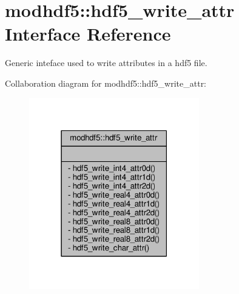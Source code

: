\hypertarget{interfacemodhdf5_1_1hdf5__write__attr}{}\section{modhdf5\+:\+:hdf5\+\_\+write\+\_\+attr Interface Reference}
\label{interfacemodhdf5_1_1hdf5__write__attr}


Generic inteface used to write attributes in a hdf5 file.  




Collaboration diagram for modhdf5\+:\+:hdf5\+\_\+write\+\_\+attr\+:\nopagebreak
\begin{figure}[H]
\begin{center}
\leavevmode
\includegraphics[width=210pt]{interfacemodhdf5_1_1hdf5__write__attr__coll__graph}
\end{center}
\end{figure}
